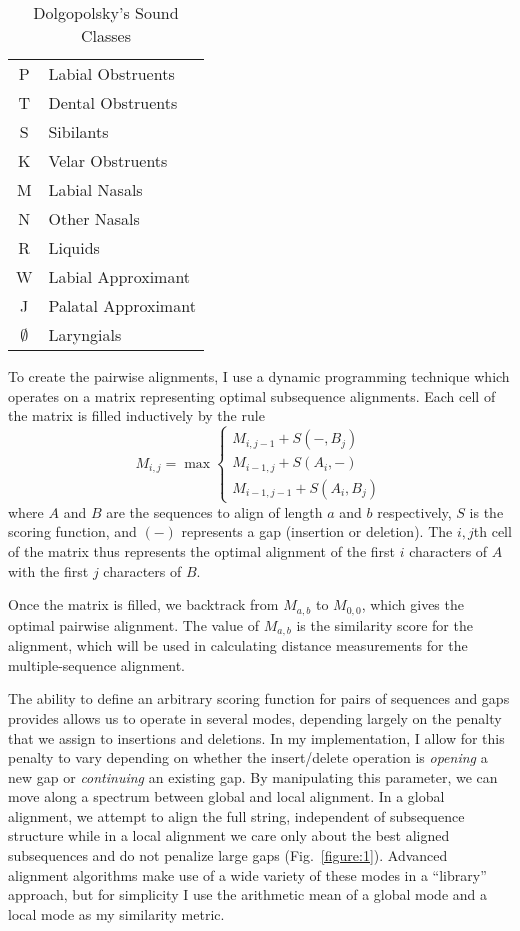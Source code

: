 \documentclass[doc,natbib,11pt]{apa6}
\begin{document}
\begin{table}[b]
	\begin{tabular}{|cl}
		P & Labial Obstruents\\
		T & Dental Obstruents\\
		S & Sibilants\\
		K & Velar Obstruents\\
		M & Labial Nasals\\
		N & Other Nasals\\
		R & Liquids \\
		W & Labial Approximant\\
		J &  Palatal Approximant\\
		$\emptyset$ & Laryngials 
	\end{tabular}
	\caption{Dolgopolsky's Sound Classes}
\end{table}

To create the pairwise alignments, I use a dynamic programming technique which operates on a matrix representing optimal subsequence alignments. Each cell of the matrix is filled inductively by the rule 
\begin{equation}
M_{i,j} = \max\begin{cases}
M_{i,j-1} + S(-, B_j)\\
M_{i-1,j} + S(A_i, -)\\
M_{i-1, j-1} + S(A_i, B_j)
\end{cases}
\end{equation}
where $A$ and $B$ are the sequences to align of length $a$ and $b$ respectively, $S$ is the scoring function, and $(-)$ represents a gap (insertion or deletion). The $i,j$th cell of the matrix thus represents the optimal alignment of the first $i$ characters of $A$ with the first $j$ characters of $B$.

Once the matrix is filled, we backtrack from $M_{a,b}$ to $M_{0,0}$, which gives the optimal pairwise alignment. The value of $M_{a,b}$ is the similarity score for the alignment, which will be used in calculating distance measurements for the multiple-sequence alignment. 

The ability to define an arbitrary scoring function for pairs of sequences and gaps provides allows us to operate in several modes, depending largely on the penalty that we assign to insertions and deletions. In my implementation, I allow for this penalty to vary depending on whether the insert/delete operation is \emph{opening} a new gap or \emph{continuing} an existing gap. By manipulating this parameter, we can move along a spectrum between global and local alignment. In a global alignment, we attempt to align the full string, independent of subsequence structure while in a local alignment we care only about the best aligned subsequences and do not penalize large gaps (Fig.~\ref{figure:1}). Advanced alignment algorithms make use of a wide variety of these modes in a ``library'' approach, but for simplicity I use the arithmetic mean of a global mode and a local mode as my similarity metric.
\end{document}
